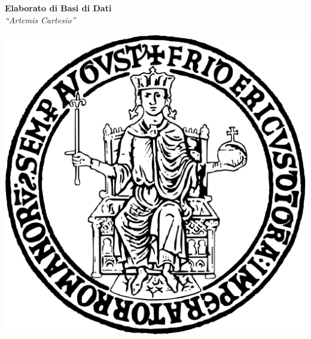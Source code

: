 \begin{titlepage}
    \begin{center}
        \Large
        \textbf{Elaborato di Basi di Dati} \\
        \vspace{0.5cm}
        \Huge
        \textit{``Artemis Cartesio''} \\
    
        \vspace{2cm}
    
        \begin{minipage}{0.4\textwidth}
            \centering
            \includegraphics[width=\textwidth]{Media/logo_unina.png}
        \end{minipage}
        \hfill
        \begin{minipage}{0.4\textwidth}
            \centering

\end{minipage}
\end{center}
\end{titlepage}
